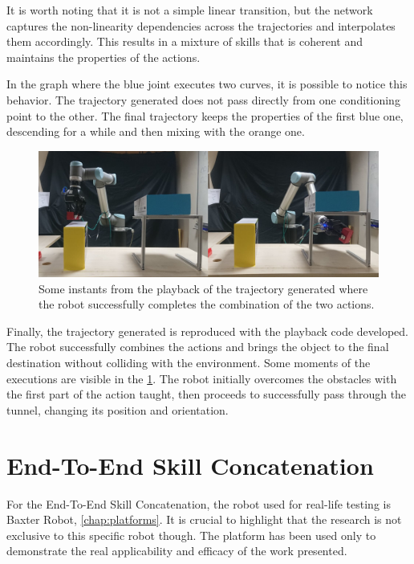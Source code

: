 It is worth noting that it is not a simple linear transition, but the network captures the non-linearity dependencies across the trajectories and interpolates them accordingly. This results in a mixture of skills that is coherent and maintains the properties of the actions. 

In the graph where the blue joint executes two curves, it is possible to notice this behavior. The trajectory generated does not pass directly from one conditioning point to the other. The final trajectory keeps the properties of the first blue one, descending for a while and then mixing with the orange one. 

\begin{figure}
    \centering
    \includegraphics[width=0.9\linewidth]{Images/6Dresult.jpg}
    \caption{ Some instants from the playback of the trajectory generated where the robot successfully completes the combination of the two actions. }
    \label{fig:6Dresult}
\end{figure}

Finally, the trajectory generated is reproduced with the playback code developed. The robot successfully combines the actions and brings the object to the final destination without colliding with the environment. Some moments of the executions are visible in the \cref{fig:6Dresult}. The robot initially overcomes the obstacles with the first part of the action taught, then proceeds to successfully pass through the tunnel, changing its position and orientation.


\newpage
\section{End-To-End Skill Concatenation}
For the End-To-End Skill Concatenation, the robot used for real-life testing is Baxter Robot, \cref{chap:platforms}.
It is crucial to highlight that the research is not exclusive to this specific robot though. The platform has been used only to demonstrate the real applicability and efficacy of the work presented. 

